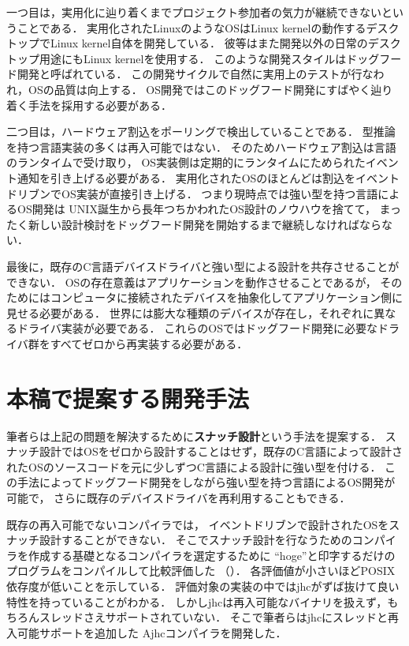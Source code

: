 \documentclass[submit,techreq,noauthor]{ipsj}
\begin{document}
一つ目は，実用化に辿り着くまでプロジェクト参加者の気力が継続できないということである．
実用化されたLinuxのようなOSはLinux kernelの動作するデスクトップでLinux kernel自体を開発している．
彼等はまた開発以外の日常のデスクトップ用途にもLinux kernelを使用する．
このような開発スタイルはドッグフード開発と呼ばれている．
この開発サイクルで自然に実用上のテストが行なわれ，OSの品質は向上する．
OS開発ではこのドッグフード開発にすばやく辿り着く手法を採用する必要がある．

二つ目は，ハードウェア割込をポーリングで検出していることである．
型推論を持つ言語実装の多くは再入可能ではない．
そのためハードウェア割込は言語のランタイムで受け取り，
OS実装側は定期的にランタイムにためられたイベント通知を引き上げる必要がある．
実用化されたOSのほとんどは割込をイベントドリブンでOS実装が直接引き上げる．
つまり現時点では強い型を持つ言語によるOS開発は
UNIX誕生から長年つちかわれたOS設計のノウハウを捨てて，
まったく新しい設計検討をドッグフード開発を開始するまで継続しなければならない．

最後に，既存のC言語デバイスドライバと強い型による設計を共存させることができない．
OSの存在意義はアプリケーションを動作させることであるが，
そのためにはコンピュータに接続されたデバイスを抽象化してアプリケーション側に見せる必要がある．
世界には膨大な種類のデバイスが存在し，それぞれに異なるドライバ実装が必要である．
これらのOSではドッグフード開発に必要なドライバ群をすべてゼロから再実装する必要がある．

\section{本稿で提案する開発手法}

筆者らは上記の問題を解決するために\textbf{スナッチ設計}という手法を提案する．
スナッチ設計ではOSをゼロから設計することはせず，既存のC言語によって設計されたOSのソースコードを元に少しずつC言語による設計に強い型を付ける．
この手法によってドッグフード開発をしながら強い型を持つ言語によるOS開発が可能で，
さらに既存のデバイスドライバを再利用することもできる．

既存の再入可能でないコンパイラでは，
イベントドリブンで設計されたOSをスナッチ設計することができない．
そこでスナッチ設計を行なうためのコンパイラを作成する基礎となるコンパイラを選定するために
``hoge''と印字するだけのプログラムをコンパイルして比較評価した
（）．
各評価値が小さいほどPOSIX依存度が低いことを示している．
評価対象の実装の中ではjhc\cite{jhc}がずば抜けて良い特性を持っていることがわかる．
しかしjhcは再入可能なバイナリを扱えず，もちろんスレッドさえサポートされていない．
そこで筆者らはjhcにスレッドと再入可能サポートを追加した
Ajhcコンパイラを開発した\cite{j-ikamusume5}．
\end{document}
